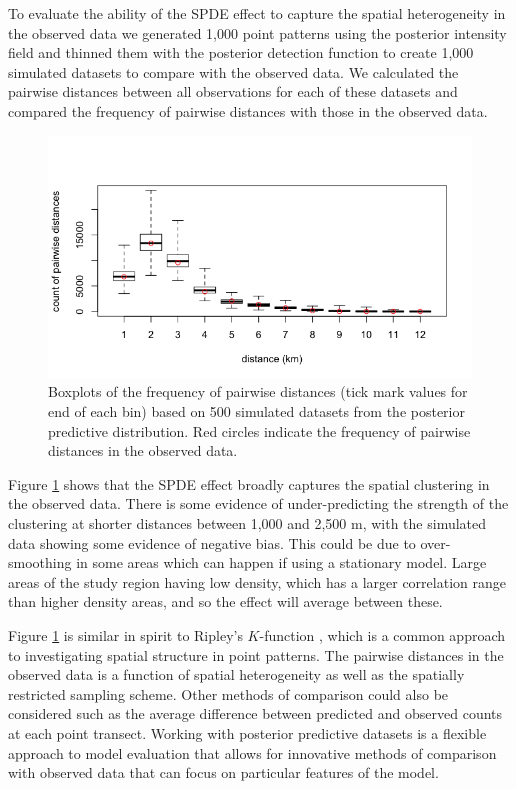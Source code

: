 \documentclass{statsoc}
\begin{document}
To evaluate the ability of the SPDE effect to capture the spatial heterogeneity in the observed data we generated 1,000 point patterns using the posterior intensity field and thinned them with the posterior detection function to create 1,000 simulated datasets to compare with the observed data.  We calculated the pairwise distances between all observations for each of these datasets and compared the frequency of pairwise distances with those in the observed data.
\begin{figure}[!htb]
	\begin{center}
		\includegraphics[scale=0.6]{figures/post_pp_distances.png}
		\caption{Boxplots of the frequency of pairwise distances (tick mark values for end of each bin) based on 500 simulated datasets from the posterior predictive distribution.  Red circles indicate the frequency of pairwise distances in the observed data.}
		\label{fig:post-pp-distances}
	\end{center}
\end{figure}
Figure \ref{fig:post-pp-distances} shows that the SPDE effect broadly captures the spatial clustering in the observed data.  There is some evidence of under-predicting the strength of the clustering at shorter distances between 1,000 and 2,500 m, with the simulated data showing some evidence of negative bias.  This could be due to over-smoothing in some areas which can happen if using a stationary model.  Large areas of the study region having low density, which has a larger correlation range than higher density areas, and so the effect will average between these. 

Figure \ref{fig:post-pp-distances} is similar in spirit to Ripley's $K$-function \citep{ripley_SecondorderAnalysisStationary_1976}, which is a common approach to investigating spatial structure in point patterns.  The pairwise distances in the observed data is a function of spatial heterogeneity as well as the spatially restricted sampling scheme.  Other methods of comparison could also be considered such as the average difference between predicted and observed counts at each point transect.  Working with posterior predictive datasets is a flexible approach to model evaluation that allows for innovative methods of comparison with observed data that can focus on particular features of the model.
\end{document}
